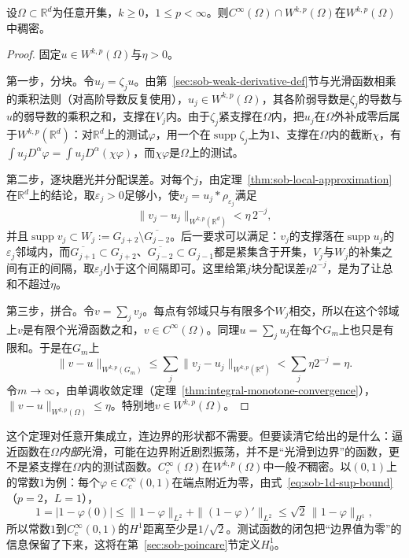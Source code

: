 \begin{theorem}[整域光滑逼近]
\label{thm:sob-meyers-serrin}
设$\Omega\subset\mathbb R^d$为任意开集，$k\ge0$，$1\le p<\infty$。则$C^\infty(\Omega)\cap W^{k,p}(\Omega)$在$W^{k,p}(\Omega)$中稠密。
\end{theorem}

\begin{proof}
固定$u\in W^{k,p}(\Omega)$与$\eta>0$。

第一步，分块。令$u_j=\zeta_ju$。由第~\ref{sec:sob-weak-derivative-def}节与光滑函数相乘的乘积法则（对高阶导数反复使用），$u_j\in W^{k,p}(\Omega)$，其各阶弱导数是$\zeta_j$的导数与$u$的弱导数的乘积之和，支撑在$V_j$内。由于$\zeta_j$紧支撑在$\Omega$内，把$u_j$在$\Omega$外补成零后属于$W^{k,p}(\mathbb R^d)$：对$\mathbb R^d$上的测试$\varphi$，用一个在$\operatorname{supp}\zeta_j$上为$1$、支撑在$\Omega$内的截断$\chi$，有$\int u_jD^\alpha\varphi=\int u_jD^\alpha(\chi\varphi)$，而$\chi\varphi$是$\Omega$上的测试。

第二步，逐块磨光并分配误差。对每个$j$，由定理~\ref{thm:sob-local-approximation}在$\mathbb R^d$上的结论，取$\varepsilon_j>0$足够小，使$v_j=u_j*\rho_{\varepsilon_j}$满足
\[
 \|v_j-u_j\|_{W^{k,p}(\mathbb R^d)}<\eta\,2^{-j},
\]
并且$\operatorname{supp}v_j\subset W_j:=G_{j+2}\setminus\overline{G_{j-2}}$。后一要求可以满足：$v_j$的支撑落在$\operatorname{supp}u_j$的$\varepsilon_j$邻域内，而$\overline{G_{j+1}}\subset G_{j+2}$、$\overline{G_{j-2}}\subset G_{j-1}$都是紧集含于开集，$V_j$与$W_j$的补集之间有正的间隔，取$\varepsilon_j$小于这个间隔即可。这里给第$j$块分配误差$\eta2^{-j}$，是为了让总和不超过$\eta$。

第三步，拼合。令$v=\sum_jv_j$。每点有邻域只与有限多个$W_j$相交，所以在这个邻域上$v$是有限个光滑函数之和，$v\in C^\infty(\Omega)$。同理$u=\sum_ju_j$在每个$G_m$上也只是有限和。于是在$G_m$上
\[
 \|v-u\|_{W^{k,p}(G_m)}\le\sum_j\|v_j-u_j\|_{W^{k,p}(\mathbb R^d)}<\sum_j\eta2^{-j}=\eta .
\]
令$m\to\infty$，由单调收敛定理（定理~\ref{thm:integral-monotone-convergence}），$\|v-u\|_{W^{k,p}(\Omega)}\le\eta$。特别地$v\in W^{k,p}(\Omega)$。
\end{proof}

这个定理对任意开集成立，连边界的形状都不需要。但要读清它给出的是什么：逼近函数在$\Omega$\emph{内部}光滑，可能在边界附近剧烈振荡，并不是“光滑到边界”的函数，更不是紧支撑在$\Omega$内的测试函数。$C_c^\infty(\Omega)$在$W^{k,p}(\Omega)$中一般\emph{不}稠密。以$(0,1)$上的常数$1$为例：每个$\varphi\in C_c^\infty(0,1)$在端点附近为零，由式~\eqref{eq:sob-1d-sup-bound}（$p=2$，$L=1$），
\[
 1=|1-\varphi(0)|\le\|1-\varphi\|_{L^2}+\|(1-\varphi)'\|_{L^2}\le\sqrt2\,\|1-\varphi\|_{H^1},
\]
所以常数$1$到$C_c^\infty(0,1)$的$H^1$距离至少是$1/\sqrt2$。测试函数的闭包把“边界值为零”的信息保留了下来，这将在第~\ref{sec:sob-poincare}节定义$H_0^1$。

